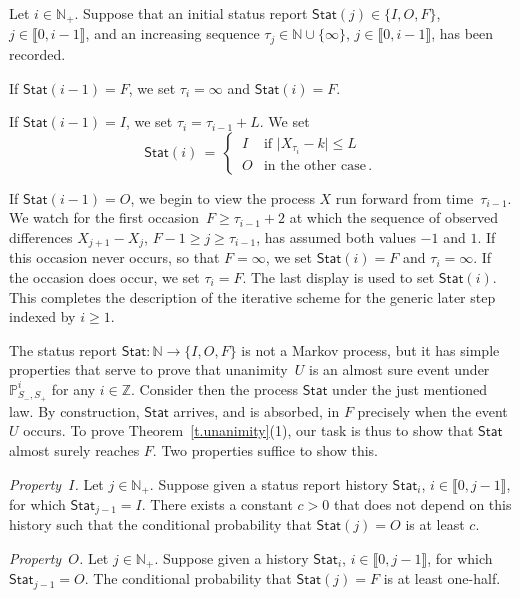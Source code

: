 \documentclass[letterpaper,11pt,oneside,reqno]{amsbook}
\newcommand{\PP}{\ensuremath{\mathbb{P}}}
\newcommand{\N}{\ensuremath{\mathbb{N}}}
\newcommand{\Z}{\ensuremath{\mathbb{Z}}}
\numberwithin{figure}{chapter}
\theoremstyle{definition}
\theoremstyle{definition}
\theoremstyle{definition}
\theoremstyle{definition}
\theoremstyle{definition}
\newcommand{\nwithzero}{\N}
\newcommand{\nwithoutzero}{\N_+}
\newcommand{\status}{\mathsf{Stat}}
\begin{document}
 Let $i \in \nwithoutzero$. Suppose that an initial status report $\status(j) \in \{I,O,F \}$, $j \in \llbracket 0,i-1 \rrbracket$,
 and an increasing sequence $\tau_j \in \N \cup \{ \infty\}$,  $j \in \llbracket 0,i-1 \rrbracket$, has been recorded.
 
 If $\status(i-1) = F$, we set $\tau_i = \infty$ and $\status(i) = F$.
 
 If $\status(i-1)= I$, we set $\tau_i = \tau_{i-1} + L$. We set
 $$
 \status(i) \, = \, \begin{cases}
  \, I  &  \text{if $\vert X_{\tau_i} - k \vert \leq L$} \\
 \, O  &  \text{in the other case} \, .
\end{cases}
$$

 
 If $\status(i-1) = O$, we begin to view the process $X$ run forward from time~$\tau_{i-1}$.  
 We watch for the first occasion~$F \geq \tau_{i-1} + 2$ at which the sequence of observed differences $X_{j+1}-X_j$, $F-1 \geq j \geq \tau_{i-1}$,
 has assumed both values $-1$ and $1$. If this occasion never occurs, so that $F = \infty$, we set $\status(i) = F$ and $\tau_i = \infty$. If the occasion does occur, we set $\tau_i = F$.
 The last display is used to set $\status(i)$. This completes the description of the iterative scheme for the generic later step indexed by $i \geq 1$.
 
 The status report $\status:\nwithzero \to \{I,O,F\}$ is not a Markov process, but it has simple properties that serve to prove that unanimity~$U$ is an almost sure event under $\PP_{S_-,S_+}^i$ for any $i \in \Z$. Consider then the process $\status$ under the just mentioned law. By construction, $\status$ arrives, and is absorbed, in $F$ precisely when the event $U$ occurs. To prove Theorem~\ref{t.unanimity}(1), our task is thus to show that $\status$ almost surely reaches $F$. Two properties suffice to show this. 
 
 {\em Property~$I$.} Let $j \in \nwithoutzero$.
 Suppose given a status report history $\status_i$, $i \in \llbracket 0,j-1\rrbracket$, for which $\status_{j-1} = I$.
 There exists a constant $c > 0$ that does not depend on this history such that the conditional probability that $\status(j) = O$ is at least $c$.
 
 
 {\em Property~$O$.} Let $j \in \nwithoutzero$.
 Suppose given a history $\status_i$, $i \in \llbracket 0,j-1\rrbracket$, for which $\status_{j-1} = O$.
 The conditional probability that $\status(j) = F$ is at least one-half.
\end{document}
